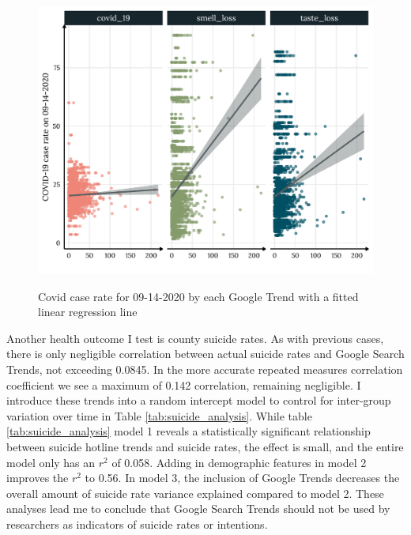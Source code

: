
\begin{figure}[h]
{\centering \includegraphics[width=0.8\linewidth]{figs/paper1/covid_plot-1.pdf}}
\caption{Covid case rate for 09-14-2020 by each Google Trend with a fitted linear regression line}\label{fig:covid_plot-1}
\end{figure}

Another health outcome I test is county suicide rates. As with previous cases,
there is only negligible correlation between actual suicide rates and Google
Search Trends, not exceeding 0.0845. In the more accurate repeated measures
correlation coefficient we see a maximum of 0.142 correlation, remaining
negligible. I introduce these trends into a random intercept model to control
for inter-group variation over time in Table \ref{tab:suicide_analysis}. While
table \ref{tab:suicide_analysis} model 1 reveals a statistically significant relationship
between suicide hotline trends and suicide rates, the effect is small, and the
entire model only has an $r^2$ of 0.058. Adding in demographic features in model
2 improves the $r^2$ to 0.56. In model 3, the inclusion of Google Trends
decreases the overall amount of suicide rate variance explained
compared to model 2. These analyses lead me to conclude that Google Search
Trends should not be used by researchers as indicators of suicide rates or intentions.

